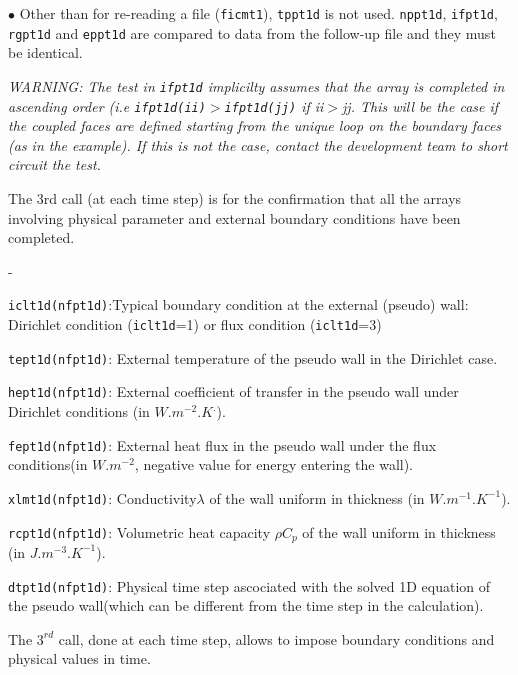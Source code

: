 {{\begin{list}{$\bullet$}{}
Other than for re-reading a file (\texttt{ficmt1}), \texttt{tppt1d} is not used.
\texttt{nppt1d}, \texttt{ifpt1d}, \texttt{rgpt1d} and \texttt{eppt1d} are
compared to data from the follow-up file and they must be identical.

{\em WARNING: The test in \texttt{ifpt1d} implicilty assumes that the array is completed
 in ascending order (i.e \texttt{ifpt1d(ii)}$>$\texttt{ifpt1d(jj)} if ii$>$jj.
 This will be the case if the coupled faces are defined starting from the unique loop on the
boundary faces (as in the example). If this is not the case, contact the development
 team to short circuit the test.}

\item The 3rd call (at each time step) is for the confirmation that all the arrays
 involving physical parameter and external boundary conditions have been completed.
\begin{list}{-}{}
\item \texttt{iclt1d(nfpt1d)}:Typical boundary condition at the external
 (pseudo) wall: Dirichlet condition (\texttt{iclt1d}=1) or flux condition (\texttt{iclt1d}=3)
\item \texttt{tept1d(nfpt1d)}: External temperature of the pseudo wall in the
 Dirichlet case.
\item \texttt{hept1d(nfpt1d)}: External coefficient of transfer in the pseudo
 wall under Dirichlet conditions (in $W.m^{-2}.K^.$).
\item \texttt{fept1d(nfpt1d)}: External heat flux in the pseudo wall under
 the flux conditions(in $W.m^{-2}$, negative value for energy entering the wall).
\item \texttt{xlmt1d(nfpt1d)}: Conductivity$\lambda$ of the wall uniform
in thickness (in $W.m^{-1}.K^{-1}$).
\item \texttt{rcpt1d(nfpt1d)}: Volumetric heat capacity $\rho C_p$ of the
wall uniform in thickness (in $J.m^{-3}.K^{-1}$).
\item \texttt{dtpt1d(nfpt1d)}: Physical time step ascociated with the solved
 1D equation of the pseudo wall(which can be different from the time step in the
 calculation).
\end{list}

\end{list}

The $3^{rd}$ call, done at each time step, allows to impose boundary conditions
 and physical values in time.

}}
